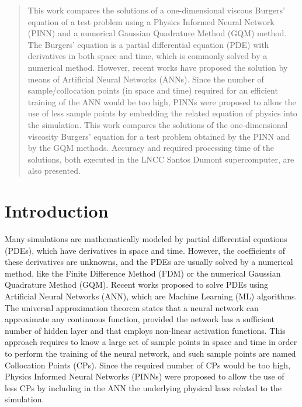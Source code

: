 \documentclass[conference]{IEEEtran}
\begin{document}
\begin{abstract}
This work compares the solutions of a one-dimensional viscous Burgers’ equation of a test problem using a Physics Informed Neural Network (PINN) and a numerical Gaussian Quadrature Method (GQM) method. The Burgers' equation is a partial differential equation (PDE) with derivatives in both space and time, which is commonly solved by a numerical method. However, recent works have proposed the solution by means of Artificial Neural Networks (ANNs). Since the number of sample/collocation points (in space and time) required for an efficient training of the ANN would be too high, PINNs were proposed to allow the use of less sample points by embedding the related equation of physics into the simulation. This work compares the solutions of the one-dimensional viscosity Burgers' equation for a test problem obtained by the PINN and by the GQM methods. Accuracy and required processing time of the solutions, both executed in the LNCC Santos Dumont supercomputer, are also presented.
\end{abstract}


%
%
%
\section{Introduction}
%
Many simulations are mathematically modeled by partial differential equations (PDEs), which have derivatives in space and time. However, the coefficients of these derivatives are unknowns, and the PDEs are usually solved by a numerical method, like the Finite Difference Method (FDM) or the numerical Gaussian Quadrature Method (GQM). Recent works proposed to solve PDEs using Artificial Neural Networks (ANN), which are Machine Learning (ML) algorithms. The universal approximation theorem states that a neural network can approximate any continuous function, provided the network has a sufficient number of hidden layer and that employs non-linear activation functions. This approach requires to know a large set of sample points in space and time in order to perform the training of the neural network, and such sample points are named Collocation Points (CPs).
Since the required number of CPs would be too high, Physics Informed Neural Networks (PINNs) were proposed to allow the use of less CPs by including in the ANN the underlying physical laws related to the simulation.   
\end{document}
